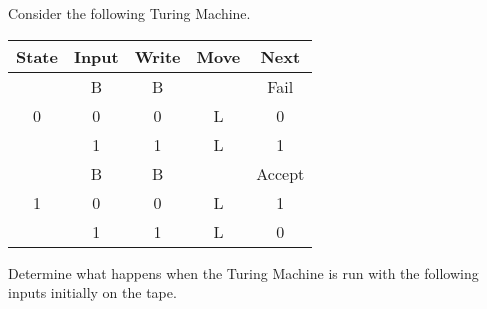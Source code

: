 

\begin{questions}

\question
Consider the following Turing Machine.

\begin{table}[H]
  \centering
  \begin{tabular}{ccccc}
    \toprule
    State	& Input	& Write & Move & Next \\
    \midrule
    \multirow{3}{*}{0} 
    	& B & B &  & Fail \\
      & 0 & 0 & L & 0 \\
      & 1 & 1 & L & 1 \\
    \midrule
    \multirow{3}{*}{1}
    	 & B & B &  & Accept \\
       & 0 & 0 & L & 1 \\
       & 1 & 1 & L & 0 \\
    \bottomrule
    \hline
  \end{tabular}
\end{table}
Determine what happens when the Turing Machine is run with the following inputs initially on the tape.
\begin{parts}
  \part 0001
  \part 0111
  \part 0110
  \part 0101010001
  \part 00000000000000111
  \part 00
  \part 
\end{parts}


\begin{solution}
\begin{parts}

\end{parts}
\end{solution}
\end{questions}
